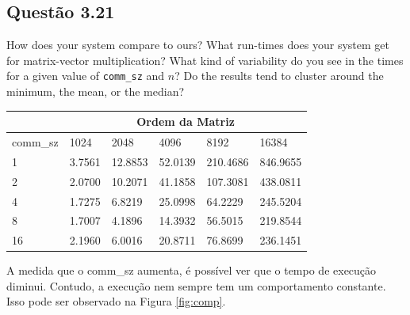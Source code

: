

\subsection{Questão 3.21}

How does your system compare to ours? What run-times does your system get for matrix-vector multiplication? What kind of variability do you see in the times for a given value of \texttt{comm\_sz} and $n$? Do the results tend to cluster around the minimum, the mean, or the median?

\begin{table}[h!]
\centering
\begin{tabular}{|l|lllll|}
    \hline
     & \multicolumn{5}{c|}{Ordem da Matriz}\\
     \hline
    comm\_sz & 1024 & 2048 & 4096 & 8192 & 16384 \\
    \hline
    1 & 3.7561 & 12.8853 & 52.0139 & 210.4686 & 846.9655 \\
    2 & 2.0700 & 10.2071 & 41.1858 & 107.3081 & 438.0811 \\
    4 & 1.7275 & 6.8219 & 25.0998 & 64.2229 & 245.5204 \\
    8 & 1.7007 & 4.1896 & 14.3932 & 56.5015 & 219.8544 \\
    16 & 2.1960 & 6.0016 & 20.8711 & 76.8699 & 236.1451 \\
    \hline
\end{tabular}
\end{table}

A medida que o comm\_sz aumenta, é possível ver que o tempo de execução diminui. Contudo, a execução nem sempre tem um comportamento constante. Isso pode ser observado na Figura \ref{fig:comp}.

